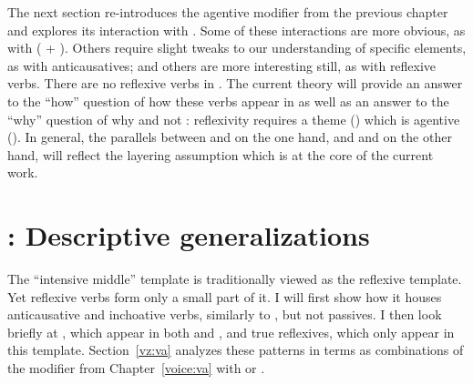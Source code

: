 \begin{exe}
\begin{xlist}
\begin{xlist}
\begin{exe}
\begin{xlist}
\begin{xlist}
\begin{exe}
\begin{xlist}
\begin{xlist}
\begin{exe}
\begin{exe}
\begin{xlist}
\begin{exe}
\begin{exe}
\begin{xlist}
\begin{exe}
\begin{exe}
\begin{exe}
\begin{exe}
\begin{exe}
\begin{xlist}
\begin{exe}
\begin{xlist}
\begin{exe}
\begin{exe}
\begin{xlist}
\begin{exe}
\begin{xlist}
\begin{exe}
\begin{xlist}
\begin{exe}
\begin{exe}
\begin{exe}
\begin{xlist}
\begin{exe}
\begin{exe}
\begin{exe}
\begin{xlist}
\begin{exe}
\begin{xlist}
\begin{exe}
\begin{xlist}
\begin{exe}
\begin{xlist}
\begin{exe}
\begin{exe}
\begin{exe}
\begin{exe}
\begin{xlist}
\begin{exe}
\begin{xlist}
\begin{exe}
\begin{xlist}
\begin{exe}
\begin{xlist}
\begin{exe}
\begin{xlist}
\begin{exe}
\begin{xlist}
\begin{exe}
\begin{exe}
\begin{exe}
\begin{exe}
\begin{xlist}
\begin{exe}
\begin{xlist}
\begin{exe}
\begin{xlist}
\begin{exe}
\begin{exe}
\begin{xlist}
The next section re-introduces the agentive modifier {\va} from the previous chapter and explores its interaction with {\vz}. Some of these interactions are more obvious, as with  ({\va} + {\pz}). Others require slight tweaks to our understanding of specific elements, as with anticausatives; and others are more interesting still, as with reflexive verbs. There are no reflexive verbs in {\tnif}. The current theory will provide an answer to the ``how'' question of how these verbs appear in {\thit} as well as an answer to the ``why'' question of why {\thit} and not {\tnif}: reflexivity requires a theme (\vz) which is agentive (\va). In general, the parallels between {\tkal} and {\thif} on the one hand, and {\tpie} and {\thit} on the other hand, will reflect the layering assumption which is at the core of the current work. 


\section{\thit: Descriptive generalizations} \label{vz:thit}
The ``intensive middle'' template {\thit} is traditionally viewed as the reflexive template. Yet reflexive verbs form only a small part of it. I will first show how it houses anticausative and inchoative verbs, similarly to {\tnif}, but not passives. I then look briefly at , which appear in both {\tnif} and {\thit}, and true reflexives, which only appear in this template. Section~\ref{vz:va} analyzes these patterns in terms as combinations of the modifier {\va} from Chapter~\ref{voice:va} with {\vz} or {\pz}.


\end{xlist}
\end{exe}
\end{exe}
\end{xlist}
\end{exe}
\end{xlist}
\end{exe}
\end{xlist}
\end{exe}
\end{exe}
\end{exe}
\end{exe}
\end{xlist}
\end{exe}
\end{xlist}
\end{exe}
\end{xlist}
\end{exe}
\end{xlist}
\end{exe}
\end{xlist}
\end{exe}
\end{xlist}
\end{exe}
\end{exe}
\end{exe}
\end{exe}
\end{xlist}
\end{exe}
\end{xlist}
\end{exe}
\end{xlist}
\end{exe}
\end{xlist}
\end{exe}
\end{exe}
\end{exe}
\end{xlist}
\end{exe}
\end{exe}
\end{exe}
\end{xlist}
\end{exe}
\end{xlist}
\end{exe}
\end{xlist}
\end{exe}
\end{exe}
\end{xlist}
\end{exe}
\end{xlist}
\end{exe}
\end{exe}
\end{exe}
\end{exe}
\end{exe}
\end{xlist}
\end{exe}
\end{exe}
\end{xlist}
\end{exe}
\end{exe}
\end{xlist}
\end{xlist}
\end{exe}
\end{xlist}
\end{xlist}
\end{exe}
\end{xlist}
\end{xlist}
\end{exe}
